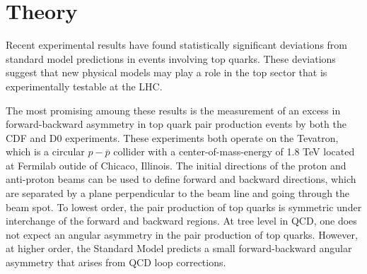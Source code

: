 
%
\section{Theory}






Recent experimental results have found statistically significant deviations from standard model predictions in events involving top quarks.
These deviations suggest that new physical models may play a role in the top sector that is experimentally testable at the LHC.

The most promising amoung these results is the measurement of an excess in forward-backward asymmetry in top quark pair production events by both the CDF and D0 experiments.
These experiments both operate on the Tevatron, which is a circular $p-\overline{p}$ collider with a center-of-mass-energy of 1.8 TeV located at Fermilab outide of Chicaco, Illinois.
The initial directions of the proton and anti-proton beams can be used to define forward and backward directions, which are separated by a plane perpendicular to the beam line and going through the beam spot.
To lowest order, the pair production of top quarks is symmetric under interchange of the forward and backward regions.
At tree level in QCD, one does not expect an angular asymmetry in the pair production of top quarks.
However, at higher order, the Standard Model predicts a small forward-backward angular asymmetry that arises from QCD loop corrections.

